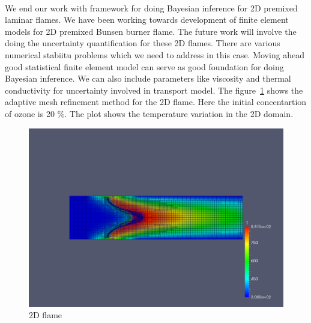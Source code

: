 \\
We end our work with  framework for doing Bayesian inference for 2D premixed laminar flames. We have been working towards development of finite element models for 2D premixed Bunsen burner flame. The future work will involve the doing the uncertainty quantification for these 2D flames. There are various numerical stabiitu problems which we need to address in this case. Moving ahead good statistical finite element model can serve as good foundation for doing Bayesian inference. We can also include parameters like viscosity and  thermal conductivity for uncertainty involved in transport model. The figure~\ref{amr_flame} shows the adaptive mesh refinement method for the 2D flame. Here the initial concentartion of ozone is 20 $\%$.  The plot shows the temperature variation in the 2D domain.

 \begin{figure}[h]
   \includegraphics[scale=0.35]{figs/flame_amr.pdf}
    \caption{2D flame}
    \label{amr_flame}
 \end{figure}

